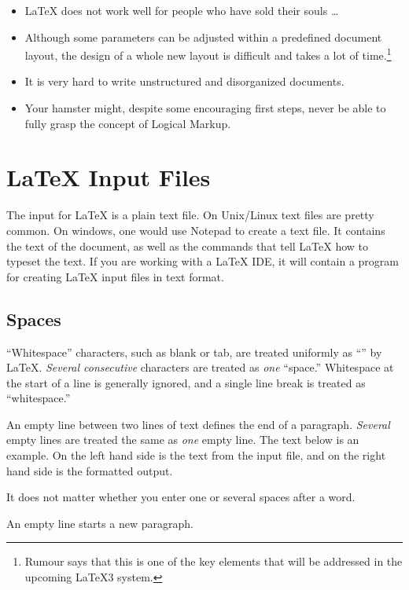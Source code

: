 \begin{itemize}
\item \LaTeX{} does not work well for people who have sold their
  souls \ldots
\item Although some parameters can be adjusted within a predefined
  document layout, the design of a whole new layout is difficult and
  takes a lot of time.\footnote{Rumour says that this is one of the
    key elements that will be addressed in the upcoming \LaTeX 3
    system.}
\item It is very hard to write unstructured and disorganized documents.
\item Your hamster might, despite some encouraging first steps, never be
able to fully grasp the concept of Logical Markup.
\end{itemize}

\section{\LaTeX{} Input Files}

The input for \LaTeX{} is a plain text file. On Unix/Linux text files are
pretty common. On windows, one would use Notepad to create a text file. It
contains the text of the document, as well as the commands that tell
\LaTeX{} how to typeset the text. If you are working with a \LaTeX{} IDE, it will contain a program for creating
\LaTeX{} input files in text format.

\subsection{Spaces}

``Whitespace'' characters, such as blank or tab, are
treated uniformly as ``'' by \LaTeX{}. \emph{Several
  consecutive}  characters are treated as \emph{one}
``space.''  Whitespace at the start of a line is generally ignored, and
a single line break is treated as ``whitespace.''

An empty line between two lines of text defines the end of a
paragraph. \emph{Several} empty lines are treated the same as
\emph{one} empty line. The text below is an example. On the left hand
side is the text from the input file, and on the right hand side is the
formatted output.

\begin{example}
It does not matter whether you
enter one or several     spaces
after a word.

An empty line starts a new 
paragraph.
\end{example}
 
